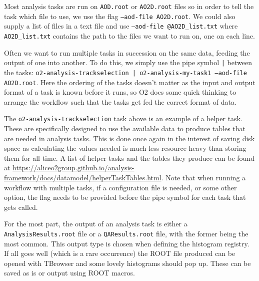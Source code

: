 Most analysis tasks are run on \texttt{AOD.root} or \texttt{AO2D.root} files so in order to tell the task which file to use, we use the flag \texttt{--aod-file AO2D.root}. We could also supply a list of files in a text file and use \texttt{--aod-file @AO2D\_list.txt} where \texttt{AO2D\_list.txt} contains the path to the files we want to run on, one on each line. 

Often we want to run multiple tasks in succession on the same data, feeding the output of one into another. To do this, we simply use the pipe symbol \texttt{|} between the tasks: \texttt{o2-analysis-trackselection | o2-analysis-my-task1 --aod-file AO2D.root}. Here the ordering of the tasks doesn't matter as the input and output format of a task is known before it runs, so O2 does some quick thinking to arrange the workflow such that the tasks get fed the correct format of data.

The \texttt{o2-analysis-trackselection} task above is an example of a helper task. These are specifically designed to use the available data to produce tables that are needed in analysis tasks. This is done once again in the interest of saving disk space as calculating the values needed is much less resource-heavy than storing them for all time. A list of helper tasks and the tables they produce can be found at \url{https://aliceo2group.github.io/analysis-framework/docs/datamodel/helperTaskTables.html}. Note that when running a workflow with multiple tasks, if a configuration file is needed, or some other option, the flag needs to be provided before the pipe symbol for each task that gets called.

For the most part, the output of an analysis task is either a \texttt{AnalysisResults.root} file or a \texttt{QAResults.root} file, with the former being the most common. This output type is chosen when defining the histogram registry. If all goes well (which is a rare occurrence) the ROOT file produced can be opened with TBrowser and some lovely histograms should pop up. These can be saved as is or output using ROOT macros. 
